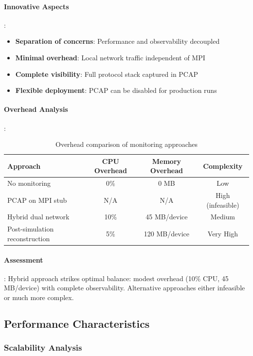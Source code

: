 \paragraph{Innovative Aspects}:
\begin{itemize}
    \item \textbf{Separation of concerns}: Performance and observability decoupled
    \item \textbf{Minimal overhead}: Local network traffic independent of MPI
    \item \textbf{Complete visibility}: Full protocol stack captured in PCAP
    \item \textbf{Flexible deployment}: PCAP can be disabled for production runs
\end{itemize}

\paragraph{Overhead Analysis}:
\begin{table}[htbp]
\centering
\caption{Overhead comparison of monitoring approaches}
\label{tab:monitoring-overhead}
\begin{tabular}{@{}lccc@{}}
\toprule
\textbf{Approach} & \textbf{CPU Overhead} & \textbf{Memory Overhead} & \textbf{Complexity} \\
\midrule
No monitoring & 0\% & 0 MB & Low \\
PCAP on MPI stub & N/A & N/A & High (infeasible) \\
Hybrid dual network & 10\% & 45 MB/device & Medium \\
Post-simulation reconstruction & 5\% & 120 MB/device & Very High \\
\bottomrule
\end{tabular}
\end{table}

\paragraph{Assessment}:
Hybrid approach strikes optimal balance: modest overhead (10\% CPU, 45 MB/device) with complete observability. Alternative approaches either infeasible or much more complex.

\subsection{Performance Characteristics}

\subsubsection{Scalability Analysis}

